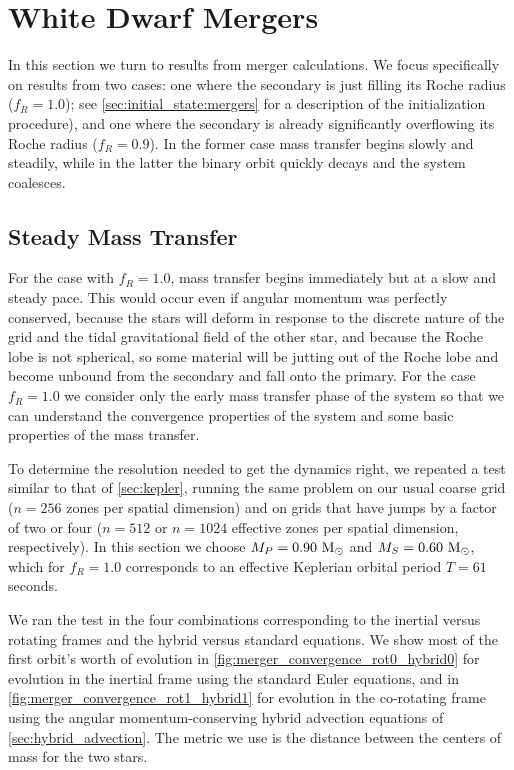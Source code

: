 \documentclass[12pt]{article}
\begin{document}
\newpage
\section{White Dwarf Mergers}
\label{sec:mergers}

In this section we turn to results from merger calculations. We focus specifically on
results from two cases: one where the secondary is just filling its Roche radius ($f_R = 1.0$);
see \autoref{sec:initial_state:mergers} for a description of the initialization procedure),
and one where the secondary is already significantly overflowing its Roche radius ($f_R = 0.9$).
In the former case mass transfer begins slowly and steadily, while in the latter the binary
orbit quickly decays and the system coalesces.

\subsection{Steady Mass Transfer}
\label{sec:mergers:stable}

For the case with $f_R = 1.0$, mass transfer begins immediately but at a slow and steady pace.
This would occur even if angular momentum was perfectly conserved, because the stars will deform
in response to the discrete nature of the grid and the tidal gravitational field of the other
star, and because the Roche lobe is not spherical, so some material will be jutting out of the
Roche lobe and become unbound from the secondary and fall onto the primary. For the case $f_R = 1.0$
we consider only the early mass transfer phase of the system so that we can understand the
convergence properties of the system and some basic properties of the mass transfer.

To determine the resolution needed to get the dynamics right, we repeated a test similar to that
of \autoref{sec:kepler}, running the same problem on our usual coarse grid ($n = 256$ zones
per spatial dimension) and on grids that have jumps by a factor of two or four ($n = 512$ or
$n = 1024$ effective zones per spatial dimension, respectively). In this section we choose
$M_P = 0.90\ \mathrm{M}_\odot$ and $M_S = 0.60\ \mathrm{M}_\odot$, which for $f_R = 1.0$ corresponds to an effective
Keplerian orbital period $T = 61$ seconds.

We ran the test in the four combinations corresponding to the inertial versus rotating frames
and the hybrid versus standard equations. We show most of the first orbit's worth of evolution
in \autoref{fig:merger_convergence_rot0_hybrid0} for evolution in the inertial frame using the
standard Euler equations, and in \autoref{fig:merger_convergence_rot1_hybrid1} for evolution
in the co-rotating frame using the angular momentum-conserving hybrid advection equations of
\autoref{sec:hybrid_advection}. The metric we use is the distance between the centers of mass
for the two stars.
\end{document}
